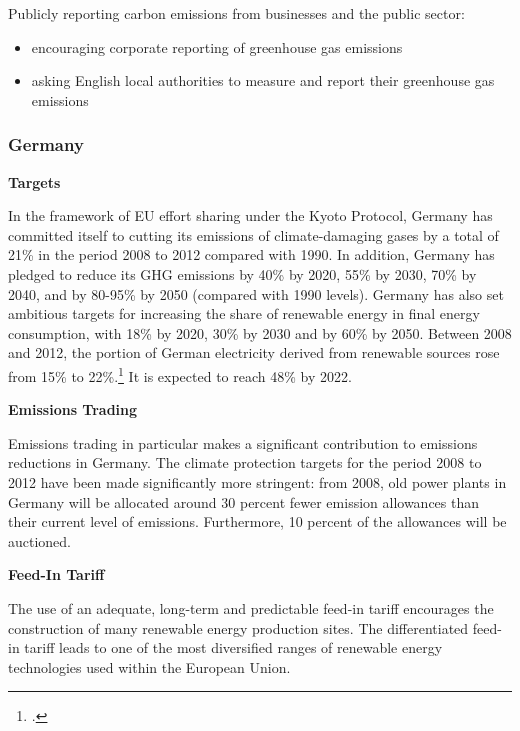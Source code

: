 Publicly reporting carbon emissions from businesses and the public sector:
\begin{itemize}
	\item encouraging corporate reporting of greenhouse gas emissions
	\item asking English local authorities to measure and report their greenhouse gas emissions
\end{itemize}



	\subsubsection{Germany}
	
	

\textbf{Targets}



In the framework of EU effort sharing under the Kyoto Protocol, Germany has committed itself to cutting its emissions of climate-damaging gases by a total of 21\% in the period 2008 to 2012 compared with 1990. 
In addition, Germany has pledged to reduce its GHG emissions by 40\% by 2020, 55\% by 2030, 70\% by 2040, and by 80-95\% by 2050 (compared with 1990 levels).  
Germany has also set ambitious targets for increasing the share of renewable energy in final energy consumption, with 18\% by 2020, 30\% by 2030 and by 60\% by 2050.
Between 2008 and 2012, the portion of German electricity derived from renewable sources rose from 15\% to 22\%.\footcite[][p. 12]{EconWindmills}
It is expected to reach 48\% by 2022.



\textbf{Emissions Trading}



Emissions trading in particular makes a significant contribution to emissions reductions in Germany. 
The climate protection targets for the period 2008 to 2012 have been made significantly more stringent: from 2008, old power plants in Germany will be allocated around 30 percent fewer emission allowances than their current level of emissions. Furthermore, 10 percent of the allowances will be auctioned. 



\textbf{Feed-In Tariff}



The use of an adequate, long-term and predictable feed-in tariff encourages the construction of many renewable energy production sites. 
The differentiated feed-in tariff leads to one of the most diversified ranges of renewable energy technologies used within the European Union.



